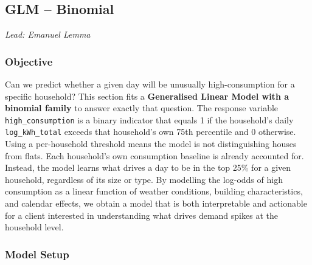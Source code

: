 \documentclass[
]{article}
\begin{document}
\subsection{GLM -- Binomial}\label{glm-binomial}

\emph{Lead: Emanuel Lemma}

\subsubsection{Objective}\label{objective-2}

Can we predict whether a given day will be unusually high-consumption
for a specific household? This section fits a \textbf{Generalised Linear
Model with a binomial family} to answer exactly that question. The
response variable \texttt{high\_consumption} is a binary indicator that
equals 1 if the household's daily \texttt{log\_kWh\_total} exceeds that
household's own 75th percentile and 0 otherwise. Using a per-household
threshold means the model is not distinguishing houses from flats. Each
household's own consumption baseline is already accounted for. Instead,
the model learns what drives a day to be in the top 25\% for a given
household, regardless of its size or type. By modelling the log-odds of
high consumption as a linear function of weather conditions, building
characteristics, and calendar effects, we obtain a model that is both
interpretable and actionable for a client interested in understanding
what drives demand spikes at the household level.

\subsubsection{Model Setup}\label{model-setup-2}
\end{document}
